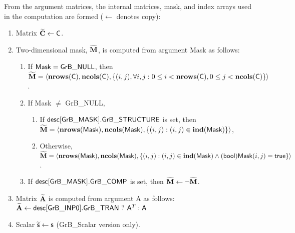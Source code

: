From the argument matrices, the internal matrices, mask, and index arrays used in 
the computation are formed ($\leftarrow$ denotes copy):
\begin{enumerate}
    \item Matrix ${\bf \widetilde{C}} \leftarrow {\sf C}$.

    \item Two-dimensional mask, ${\bf \widetilde{M}}$, is computed from 
    argument {\sf Mask} as follows:
    \begin{enumerate}
        \item If ${\sf Mask} = {\sf GrB\_NULL}$, then ${\bf \widetilde{M}} = 
        \langle \bold{nrows}({\sf C}), \bold{ncols}({\sf C}), \{(i,j), 
        \forall i,j : 0 \leq i <  \bold{nrows}({\sf C}), 0 \leq j < 
        \bold{ncols}({\sf C}) \} \rangle$.

        \item If {\sf Mask} $\ne$ {\sf GrB\_NULL},
        \begin{enumerate}
            \item If ${\sf desc[GrB\_MASK].GrB\_STRUCTURE}$ is set, then 
            ${\bf \widetilde{M}} = \langle \bold{nrows}({\sf Mask}), 
            \bold{ncols}({\sf Mask}), \{(i,j) : (i,j) \in \bold{ind}({\sf Mask}) \} \rangle$,
            \item Otherwise, ${\bf \widetilde{M}} = \langle \bold{nrows}({\sf Mask}), 
            \bold{ncols}({\sf Mask}), \\ \{(i,j) : (i,j) \in \bold{ind}({\sf Mask}) \wedge 
            ({\sf bool}){\sf Mask}(i,j) = {\sf true}\} \rangle$.
        \end{enumerate}

        \item    If ${\sf desc[GrB\_MASK].GrB\_COMP}$ is set, then 
        ${\bf \widetilde{M}} \leftarrow \neg {\bf \widetilde{M}}$.
    \end{enumerate}

    \item Matrix ${\bf \widetilde{A}}$ is computed from argument {\sf A} as 
    follows:  ${\bf \widetilde{A}}\leftarrow {\sf desc[GrB\_INP0].GrB\_TRAN} \ ? \ {\sf A}^T : {\sf A}$

    \item Scalar $\widetilde{\sf s} \leftarrow {\sf s}$ ({\sf GrB\_Scalar} version only).
\end{enumerate}

